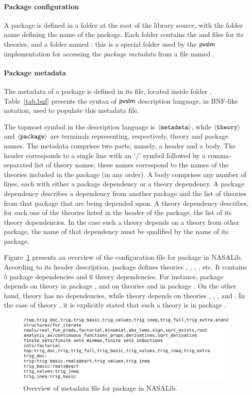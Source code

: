 \paragraph{Package configuration}
A package is defined in a folder at the root of the library source,
with the folder name defining the name of the package. Each folder
contains the  and  files for its theories, and a
folder named : this is a special folder used by the
$\textsf{pvslm}$ implementation for accessing the {\em package metadata} from
a file named .

\paragraph{Package metadata} The metadata of a package is defined
in its  file, located inside folder
. Table~\ref{tab.bnf} presents the syntax of $\textsf{pvslm}$
description language, in BNF-like notation, used to populate this
metadata file.

The topmost symbol in the description language is
$\langle{\texttt{metadata}}\rangle$, while $\langle{\texttt{theory}}\rangle$ and
$\langle{\texttt{package}}\rangle$ are terminals representing, respectively,
theory and package names. The metadata comprises two parts, namely, a
header and a body. The header corresponds to a single line with an `/'
symbol followed by a comma-separated list of theory names; these names
correspond to the names of the theories included in the package (in
any order). A body comprises any number of lines, each with either a
package dependency or a theory dependency. A package dependency
describes a dependency from another package and the list of theories
from that package that are being depended upon. A theory dependency
describes, for each one of the theories listed in the header of the
package, the list of its theory dependencies. In the case such a
theory depends on a theory from other package, the name of that
dependency must be qualified by the name of its package.

Figure~\ref{fig.top} presents an overview of the configuration file
for package  in NASALib. According to its header
description, package  defines theories ,
, , , etc. It contains $5$
package dependencies and $6$ theory dependencies. For instance,
package  depends on theory  in package
, and on theories  and
 in package . On the
other hand, theory  has no dependencies, while theory
 depends on theories , ,
, and . In the case of theory
, it is explicitly stated that such a theory is in package
.

\begin{figure}[pthb]
  \centering
  \includegraphics[width=12cm]{images/top.png}
  \caption{Overview of metadata file for package  in NASALib.}
  \label{fig.top}
\end{figure}
